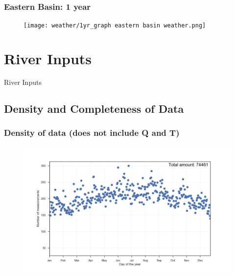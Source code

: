 \documentclass{beamer}
\begin{document}
\begin{frame}
\frametitle{Eastern Basin: 1 year}
\begin{figure}
\texttt{[image: weather/1yr\_graph  eastern basin weather.png]}
\end{figure}
\end{frame}



\section{River Inputs}

\begin{frame}
\begin{center}
\Huge River Inputs
\end{center}
\end{frame}

\subsection{Density and Completeness of Data}


\begin{frame}
\frametitle{Density of data (does not include Q and T)}
\begin{figure}
\includegraphics[width=\textwidth]{rivers/density_of_measurements.png}
\end{figure}
\end{frame}
\end{document}
